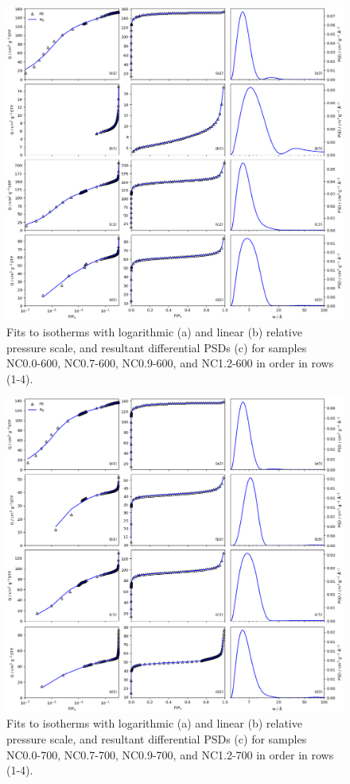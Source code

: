 \begin{appendices}
\begin{figure}[p]
    \centering
    \includegraphics[width=\columnwidth, keepaspectratio]{4-impregnation/figs/NCxx-600_isopsd.png}
    \caption{Fits to  isotherms with logarithmic (a) and linear (b) relative pressure scale, and resultant differential PSDs (c) for samples NC0.0-600, NC0.7-600, NC0.9-600, and NC1.2-600 in order in rows (1-4).}
    \label{fig:NCxx-600_psdisofull}
\end{figure}

\begin{figure}[p]
    \centering
    \includegraphics[width=\columnwidth, keepaspectratio]{4-impregnation/figs/NCxx-700_isopsd.png}
    \caption{Fits to  isotherms with logarithmic (a) and linear (b) relative pressure scale, and resultant differential PSDs (c) for samples NC0.0-700, NC0.7-700, NC0.9-700, and NC1.2-700 in order in rows (1-4).}
    \label{fig:NCxx-700_psdisofull}
\end{figure}


\end{appendices}
